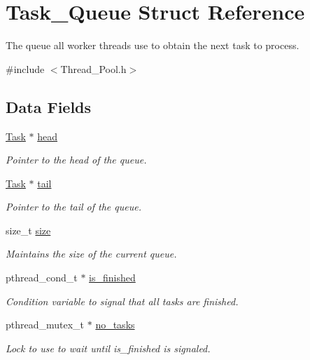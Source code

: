 \hypertarget{struct_task___queue}{}\section{Task\+\_\+\+Queue Struct Reference}
\label{struct_task___queue}


The queue all worker threads use to obtain the next task to process.  




{\ttfamily \#include $<$Thread\+\_\+\+Pool.\+h$>$}

\subsection*{Data Fields}
\begin{DoxyCompactItemize}
\item 
\hyperlink{struct_task}{Task} $\ast$ \hyperlink{struct_task___queue_af5acea37bcf6ce1d8fcd3e164a93b37d}{head}
\begin{DoxyCompactList}\small\item\em Pointer to the head of the queue. \end{DoxyCompactList}\item 
\hyperlink{struct_task}{Task} $\ast$ \hyperlink{struct_task___queue_a5ecf97d7a2c4b562c68aaf5514691fc1}{tail}
\begin{DoxyCompactList}\small\item\em Pointer to the tail of the queue. \end{DoxyCompactList}\item 
size\+\_\+t \hyperlink{struct_task___queue_a854352f53b148adc24983a58a1866d66}{size}
\begin{DoxyCompactList}\small\item\em Maintains the size of the current queue. \end{DoxyCompactList}\item 
pthread\+\_\+cond\+\_\+t $\ast$ \hyperlink{struct_task___queue_a5516e2d0cf00a5eeb4fb0ed563302577}{is\+\_\+finished}
\begin{DoxyCompactList}\small\item\em Condition variable to signal that all tasks are finished. \end{DoxyCompactList}\item 
pthread\+\_\+mutex\+\_\+t $\ast$ \hyperlink{struct_task___queue_a82c4f8c176f73a4611cfd93d8182047e}{no\+\_\+tasks}
\begin{DoxyCompactList}\small\item\em Lock to use to wait until is\+\_\+finished is signaled. \end{DoxyCompactList}\item 

\end{DoxyCompactItemize}
